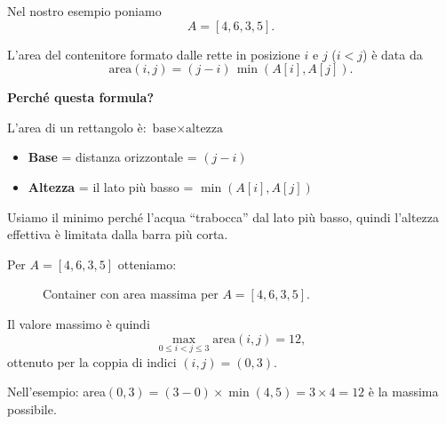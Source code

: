 \medskip
Nel nostro esempio poniamo
\[
A = [4,6,3,5].
\]

L'area del contenitore formato dalle rette in posizione $i$ e $j$
($i < j$) è data da
\[
\mathrm{area}(i,j) = (j-i)\,\min(A[i],A[j]).
\]

\begin{nota}
	\textbf{Perché questa formula?}
	
	L'area di un rettangolo è: $\text{base} \times \text{altezza}$
	\begin{itemize}
		\item \textbf{Base} = distanza orizzontale = $(j-i)$
		\item \textbf{Altezza} = il lato più basso = $\min(A[i], A[j])$
	\end{itemize}
	
	Usiamo il minimo perché l'acqua ``trabocca'' dal lato più basso, quindi l'altezza effettiva è limitata dalla barra più corta.
\end{nota}

Per $A = [4,6,3,5]$ otteniamo:

\begin{figure}[H]
	\centering
	\caption{Container con area massima per $A = [4,6,3,5]$.}
\end{figure}

Il valore massimo è quindi
\[
\max_{0 \le i < j \le 3} \mathrm{area}(i,j) = 12,
\]
ottenuto per la coppia di indici $(i,j) = (0,3)$.

\begin{softnote}
	Nell'esempio: area$(0,3) = (3-0) \times \min(4,5) = 3 \times 4 = 12$ è la massima possibile.
\end{softnote}

